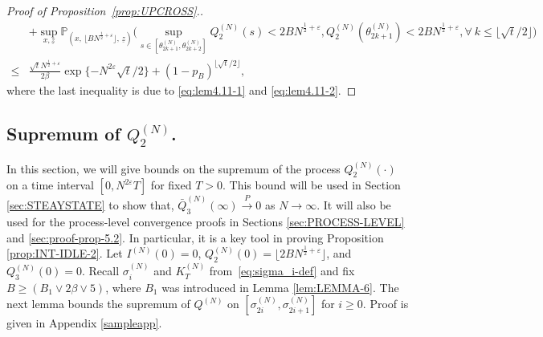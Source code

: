 \documentclass[11pt, reqno]{article}
\numberwithin{equation}{section}
\numberwithin{theorem}{section}
\begin{document}
\begin{proof}[Proof of Proposition~\ref{prop:UPCROSS}.]
\begin{align*}
    &+\sup_{x,\underline{z}} \mathbb{P}_{(x, \, \lfloor BN^{\frac{1}{2}+\varepsilon} \rfloor, \,\underline{z})}\big(\sup_{s\in[\theta^{(N)}_{2k+1},\theta^{(N)}_{2k+2}]}Q^{(N)}_2(s)<2BN^{\frac{1}{2}+\varepsilon},Q^{(N)}_2(\theta^{(N)}_{2k+1})<2BN^{\frac{1}{2}+\varepsilon},\forall\ k\leq \lfloor\sqrt{t}/2\rfloor\big)\\
    \leq & \frac{\sqrt{t} N^{\frac{1}{2}+\varepsilon}}{2\beta} \exp \{-N^{2\varepsilon}\sqrt{t}/2\}+(1-p_B)^{\lfloor\sqrt{t}/2\rfloor},
\end{align*}
where the last inequality is due to \eqref{eq:lem4.11-1} and \eqref{eq:lem4.11-2}.
\end{proof}

\subsection{Supremum of \texorpdfstring{$Q^{(N)}_2$}{Q2}.}\label{ssec:supremum Q2}
In this section, we will give bounds on the supremum of the process $Q^{(N)}_2(\cdot)$ on a time interval $[0,N^{2\varepsilon}T]$ for fixed $T>0$. This bound will be used in Section \ref{sec:STEAYSTATE} to show that, $\bar{Q}^{(N)}_3(\infty) \xrightarrow{P} 0$ as $N \rightarrow \infty$. It will also be used for the process-level convergence proofs in Sections \ref{sec:PROCESS-LEVEL} and \ref{sec:proof-prop-5.2}. In particular, it is a key tool in proving Proposition \ref{prop:INT-IDLE-2}.
Let $I^{(N)}(0)=0$, $Q^{(N)}_2(0)= \lfloor2BN^{\frac{1}{2}+\varepsilon}\rfloor$, and $Q^{(N)}_3(0)=0$.
Recall $\sigma^{(N)}_i$ and $K^{(N)}_T$ from~\eqref{eq:sigma_i-def} and 
fix $B\geq(B_1\vee 2\beta\vee 5)$, where $B_1$ was introduced in Lemma \ref{lem:LEMMA-6}. The next lemma bounds the supremum of $Q^{(N)}$ on $[\sigma^{(N)}_{2i},\sigma^{(N)}_{2i+1}]$ for $i \ge 0$. Proof is given in Appendix \ref{sampleapp}.
\end{document}
